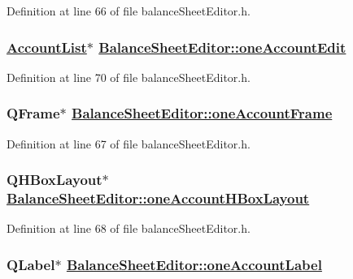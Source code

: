 Definition at line 66 of file balance\-Sheet\-Editor.h.\hypertarget{classBalanceSheetEditor_r13}{
\subsubsection[oneAccountEdit]{\setlength{\rightskip}{0pt plus 5cm}\hyperlink{classAccountList}{Account\-List}$\ast$ \hyperlink{classBalanceSheetEditor_r13}{Balance\-Sheet\-Editor::one\-Account\-Edit}}}
\label{classBalanceSheetEditor_r13}


Definition at line 70 of file balance\-Sheet\-Editor.h.\hypertarget{classBalanceSheetEditor_r10}{
\subsubsection[oneAccountFrame]{\setlength{\rightskip}{0pt plus 5cm}QFrame$\ast$ \hyperlink{classBalanceSheetEditor_r10}{Balance\-Sheet\-Editor::one\-Account\-Frame}}}
\label{classBalanceSheetEditor_r10}


Definition at line 67 of file balance\-Sheet\-Editor.h.\hypertarget{classBalanceSheetEditor_r11}{
\subsubsection[oneAccountHBoxLayout]{\setlength{\rightskip}{0pt plus 5cm}QHBox\-Layout$\ast$ \hyperlink{classBalanceSheetEditor_r11}{Balance\-Sheet\-Editor::one\-Account\-HBox\-Layout}}}
\label{classBalanceSheetEditor_r11}


Definition at line 68 of file balance\-Sheet\-Editor.h.\hypertarget{classBalanceSheetEditor_r12}{
\subsubsection[oneAccountLabel]{\setlength{\rightskip}{0pt plus 5cm}QLabel$\ast$ \hyperlink{classBalanceSheetEditor_r12}{Balance\-Sheet\-Editor::one\-Account\-Label}}}
\label{classBalanceSheetEditor_r12}


